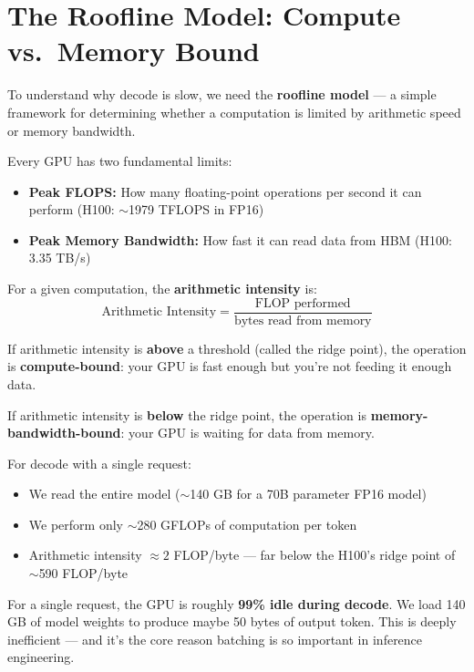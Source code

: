\documentclass[11pt, twoside, openright]{book}
\newcommand{\warnbox}[2]{\begin{tcolorbox}[warnstyle, title={#1}]#2\end{tcolorbox}}
\newcommand{\keyterm}[1]{\textbf{\color{AccentOrange}#1}}
\begin{document}
\section{The Roofline Model: Compute vs.\ Memory Bound}

To understand why decode is slow, we need the \keyterm{roofline model} --- a
simple framework for determining whether a computation is limited by arithmetic
speed or memory bandwidth.

Every GPU has two fundamental limits:
\begin{itemize}
  \item \textbf{Peak FLOPS:} How many floating-point operations per second it can
        perform (H100: $\sim$1979 TFLOPS in FP16)
  \item \textbf{Peak Memory Bandwidth:} How fast it can read data from HBM
        (H100: 3.35 TB/s)
\end{itemize}

For a given computation, the \textbf{arithmetic intensity} is:
\[
  \text{Arithmetic Intensity} =
  \frac{\text{FLOP performed}}{\text{bytes read from memory}}
\]

If arithmetic intensity is \textbf{above} a threshold (called the ridge point),
the operation is \textbf{compute-bound}: your GPU is fast enough but you're
not feeding it enough data.

If arithmetic intensity is \textbf{below} the ridge point, the operation is
\textbf{memory-bandwidth-bound}: your GPU is waiting for data from memory.

For decode with a single request:
\begin{itemize}
  \item We read the entire model ($\sim$140 GB for a 70B parameter FP16 model)
  \item We perform only $\sim$280 GFLOPs of computation per token
  \item Arithmetic intensity $\approx 2$ FLOP/byte --- far below the H100's
        ridge point of $\sim$590 FLOP/byte
\end{itemize}

\warnbox{The Decode Efficiency Problem}{
For a single request, the GPU is roughly \textbf{99\% idle during decode}.
We load 140 GB of model weights to produce maybe 50 bytes of output token.
This is deeply inefficient --- and it's the core reason batching is so
important in inference engineering.
}
\end{document}
